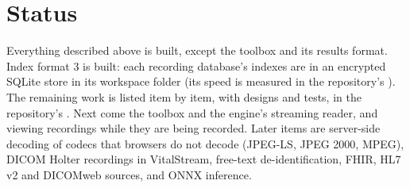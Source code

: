 \section{Status}
\label{sec:architecture-status}

Everything described above is built, except the toolbox and its results format. Index format 3
is built: each recording database's indexes are in an encrypted SQLite store in its workspace
folder (its speed is measured in the repository's ). The remaining work is listed item by item, with
designs and tests, in the repository's . Next come the toolbox and the
engine's streaming reader, and viewing recordings while they are being recorded. Later items are
server-side decoding of codecs that browsers do not decode (JPEG-LS, JPEG 2000, MPEG), DICOM
Holter recordings in VitalStream, free-text de-identification, FHIR, HL7 v2 and DICOMweb sources,
and ONNX inference.
